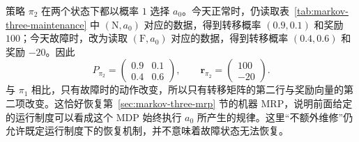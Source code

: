 \documentclass[UTF8,12pt,a4paper,fontset=fandol]{ctexart}
\begin{document}
\begin{example}[正常和故障时都不额外维修]
\label{ex:markov-three-policy-no-repair}
策略 $\pi_2$ 在两个状态下都以概率 $1$ 选择 $a_0$。今天正常时，仍读取表~\ref{tab:markov-three-maintenance} 中 $(\mathrm N,a_0)$ 对应的数据，得到转移概率 $(0.9,0.1)$ 和奖励 $100$；今天故障时，改为读取 $(\mathrm F,a_0)$ 对应的数据，得到转移概率 $(0.4,0.6)$ 和奖励 $-20$。因此
\begin{equation}
  P_{\pi_2}=\begin{pmatrix}0.9&0.1\\0.4&0.6\end{pmatrix},
  \qquad
  \boldsymbol r_{\pi_2}=\begin{pmatrix}100\\-20\end{pmatrix}.
  \label{eq:markov-three-policy-no-repair-mrp}
\end{equation}
与 $\pi_1$ 相比，只有故障时的动作改变，所以只有转移矩阵的第二行与奖励向量的第二项改变。这恰好恢复第~\ref{sec:markov-three-mrp} 节的机器 MRP，说明前面给定的运行制度可以看成这个 MDP 始终执行 $a_0$ 所产生的规律。这里“不额外维修”仍允许既定运行制度下的恢复机制，并不意味着故障状态无法恢复。
\end{example}
\end{document}
